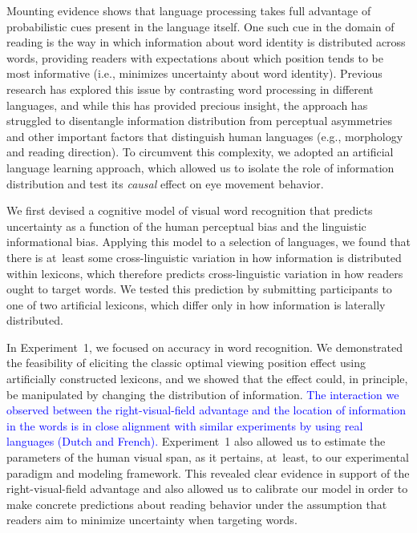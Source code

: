 \documentclass[doc,biblatex]{apa7}
\newcommand\newmaterial[1]{\textcolor{blue}{#1}}
\begin{document}
Mounting evidence shows that language processing takes full advantage of probabilistic cues present in the language itself. One such cue in the domain of reading is the way in which information about word identity is distributed across words, providing readers with expectations about which position tends to be most informative (i.e., minimizes uncertainty about word identity). Previous research has explored this issue by contrasting word processing in different languages, and while this has provided precious insight, the approach has struggled to disentangle information distribution from perceptual asymmetries and other important factors that distinguish human languages (e.g., morphology and reading direction). To circumvent this complexity, we adopted an artificial language learning approach, which allowed us to isolate the role of information distribution and test its \textit{causal} effect on eye movement behavior.

We first devised a cognitive model of visual word recognition that predicts uncertainty as a function of the human perceptual bias and the linguistic informational bias. Applying this model to a selection of languages, we found that there is at~least some cross-linguistic variation in how information is distributed within lexicons, which therefore predicts cross-linguistic variation in how readers ought to target words. We tested this prediction by submitting participants to one of two artificial lexicons, which differ only in how information is laterally distributed.

In Experiment~1, we focused on accuracy in word recognition. We demonstrated the feasibility of eliciting the classic optimal viewing position effect \parencite{ORegan:1984, Brysbaert:2005, Hyona:2011} using artificially constructed lexicons, and we showed that the effect could, in principle, be manipulated by changing the distribution of information. \newmaterial{The interaction we observed between the right-visual-field advantage and the location of information in the words is in close alignment with similar experiments by \textcite{Brysbaert:1996} using real languages (Dutch and French).} Experiment~1 also allowed us to estimate the parameters of the human visual span, as it pertains, at~least, to our experimental paradigm and modeling framework. This revealed clear evidence in support of the right-visual-field advantage and also allowed us to calibrate our model in order to make concrete predictions about reading behavior under the assumption that readers aim to minimize uncertainty when targeting words.
\end{document}
